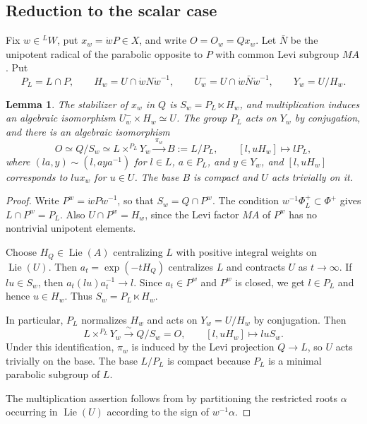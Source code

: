 \documentclass[a4paper,12pt]{amsart}
\numberwithin{equation}{section}
\theoremstyle{plain}
\newtheorem{lemma}[theorem]{Lemma}
\theoremstyle{definition}
\theoremstyle{remark}
\begin{document}
\subsection{Reduction to the scalar case}

Fix $w\in{}^LW$, put $x_w=\dot wP\in X$, and write $O=O_w=Qx_w$.
Let $\bar N$ be the unipotent radical of the parabolic opposite to $P$ with common Levi subgroup $MA$.
Put
\[
P_L=L\cap P,\qquad H_w=U\cap\dot wN\dot w^{-1},\qquad
U_w^-=U\cap\dot w\bar N\dot w^{-1},\qquad Y_w=U/H_w.
\]

\begin{lemma}\label{L:orbit-fibration}
The stabilizer of $x_w$ in $Q$ is $S_w=P_L\ltimes H_w$, and multiplication induces an algebraic isomorphism $U_w^-\times H_w\simeq U$.
The group $P_L$ acts on $Y_w$ by conjugation, and there is an algebraic isomorphism
\begin{equation}\label{Eq:orbit-fibration}
O\simeq Q/S_w\simeq L\times^{P_L}Y_w
\xrightarrow{\ \pi_w\ }B:=L/P_L,
\qquad [l,uH_w]\longmapsto lP_L,
\end{equation}
where $(la,y)\sim(l,aya^{-1})$ for $l\in L$, $a\in P_L$, and $y\in Y_w$, and $[l,uH_w]$ corresponds to $lu x_w$ for $u\in U$.
The base $B$ is compact and $U$ acts trivially on it.
\end{lemma}

\begin{proof}
Write $P^w=\dot wP\dot w^{-1}$, so that $S_w=Q\cap P^w$.
The condition $w^{-1}\Phi_L^+\subset\Phi^+$ gives $L\cap P^w=P_L$.
Also $U\cap P^w=H_w$, since the Levi factor $MA$ of $P^w$ has no nontrivial unipotent elements.

Choose $H_Q\in\operatorname{Lie}(A)$ centralizing $L$ with positive integral weights on $\operatorname{Lie}(U)$.
Then $a_t=\exp(-tH_Q)$ centralizes $L$ and contracts $U$ as $t\to\infty$.
If $lu\in S_w$, then $a_t(lu)a_t^{-1}\to l$.
Since $a_t\in P^w$ and $P^w$ is closed, we get $l\in P_L$ and hence $u\in H_w$.
Thus $S_w=P_L\ltimes H_w$.

In particular, $P_L$ normalizes $H_w$ and acts on $Y_w=U/H_w$ by conjugation.
Then
\[
 L\times^{P_L}Y_w \xrightarrow{\ \sim\ } Q/S_w=O,
 \qquad [l,uH_w]\longmapsto luS_w.
\]
Under this identification, $\pi_w$ is induced by the Levi projection $Q\to L$, so $U$ acts trivially on the base.
The base $L/P_L$ is compact because $P_L$ is a minimal parabolic subgroup of $L$.

The multiplication assertion follows from \cite[Proposition~3.11]{BT65} by partitioning the restricted roots $\alpha$ occurring in $\operatorname{Lie}(U)$ according to the sign of $w^{-1}\alpha$.
\end{proof}
\end{document}
